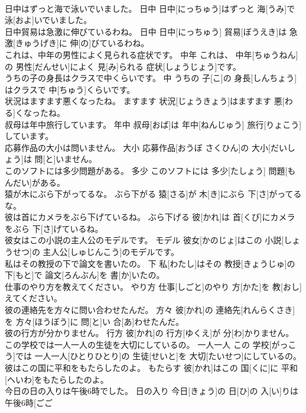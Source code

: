 \documentclass[8pt]{extreport}
\begin{document}
\begin{CJK}{UTF8}{min}
\\	日中はずっと海で泳いでいました。	日中	日中[にっちゅう]はずっと 海[うみ]で 泳[およ]いでいました。	
\\	日中貿易は急激に伸びているわね。	日中	日中[にっちゅう] 貿易[ぼうえき]は 急激[きゅうげき]に 伸[の]びているわね。	
\\	これは、中年の男性によく見られる症状です。	中年	これは、 中年[ちゅうねん]の 男性[だんせい]によく 見[み]られる 症状[しょうじょう]です。	
\\	うちの子の身長はクラスで中くらいです。	中	うちの 子[こ]の 身長[しんちょう]はクラスで 中[ちゅう]くらいです。	
\\	状況はますます悪くなったね。	ますます	状況[じょうきょう]はますます 悪[わる]くなったね。	
\\	叔母は年中旅行しています。	年中	叔母[おば]は 年中[ねんじゅう] 旅行[りょこう]しています。	
\\	応募作品の大小は問いません。	大小	応募作品[おうぼ さくひん]の 大小[だいしょう]は 問[と]いません。	
\\	このソフトには多少問題がある。	多少	このソフトには 多少[たしょう] 問題[もんだい]がある。	
\\	猿が木にぶら下がってるな。	ぶら下がる	猿[さる]が 木[き]にぶら 下[さ]がってるな。	
\\	彼は首にカメラをぶら下げているね。	ぶら下げる	彼[かれ]は 首[くび]にカメラをぶら 下[さ]げているね。	
\\	彼女はこの小説の主人公のモデルです。	モデル	彼女[かのじょ]はこの 小説[しょうせつ]の 主人公[しゅじんこう]のモデルです。	
\\	私はその教授の下で論文を書いたの。	下	私[わたし]はその 教授[きょうじゅ]の 下[もと]で 論文[ろんぶん]を 書[か]いたの。	
\\	仕事のやり方を教えてください。	やり方	仕事[しごと]のやり 方[かた]を 教[おし]えてください。	
\\	彼の連絡先を方々に問い合わせたんだ。	方々	彼[かれ]の 連絡先[れんらくさき]を 方々[ほうぼう]に 問[と]い 合[あ]わせたんだ。	
\\	彼の行方が分かりません。	行方	彼[かれ]の 行方[ゆくえ]が 分[わ]かりません。	
\\	この学校では一人一人の生徒を大切にしているの。	一人一人	この 学校[がっこう]では 一人一人[ひとりひとり]の 生徒[せいと]を 大切[たいせつ]にしているの。	
\\	彼はこの国に平和をもたらしたのよ。	もたらす	彼[かれ]はこの 国[くに]に 平和[へいわ]をもたらしたのよ。	
\\	今日の日の入りは午後6時でした。	日の入り	今日[きょう]の 日[ひ]の 入[い]りは 午後6時[ごご 

\end{CJK}
\end{document}
